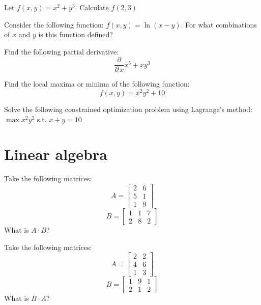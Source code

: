 \documentclass[10pt]{article}
\newenvironment{problem}[2][Problem]{\begin{trivlist}
\item[\hskip \labelsep {\bfseries #1}\hskip \labelsep {\bfseries #2.}]}{\end{trivlist}}
\begin{document}
\begin{problem}{3.8}
Let $f(x,y)=x^2+y^3$. Calculate $f(2,3)$
\end{problem}

\begin{problem}{3.9}
Consider the following function: $f(x,y)=\ln(x-y)$. For what combinations of $x$ and $y$ is this function defined?
\end{problem}

\begin{problem}{3.10}
Find the following partial derivative:
$$\frac{\partial}{\partial \, x} x^5+xy^3$$
\end{problem}

\begin{problem}{3.11}
Find the local maxima or minima of the following function:
$$f(x,y)=x^2y^2+10$$
\end{problem}

\begin{problem}{3.12}
Solve the following constrained optimization problem using Lagrange's method:
$\max x^2y^2$ s.t. $x+y=10$
\end{problem}

\section{Linear algebra}

\begin{problem}{4.1}
Take the following matrices:
$$A=\begin{bmatrix} 2 & 6\\ 5 & 1 \\ 1 & 9\end{bmatrix}$$
$$B=\begin{bmatrix} 1 & 1 & 7\\2 & 8 & 2\end{bmatrix}$$
What is $A \cdot B$?
\end{problem}

\begin{problem}{4.2}
Take the following matrices:
$$A=\begin{bmatrix} 2 & 2\\ 4 & 6 \\ 1 & 3\end{bmatrix}$$
$$B=\begin{bmatrix} 1 & 9 & 1\\2 & 1 & 2\end{bmatrix}$$
What is $B \cdot A$?
\end{problem}
\end{document}
